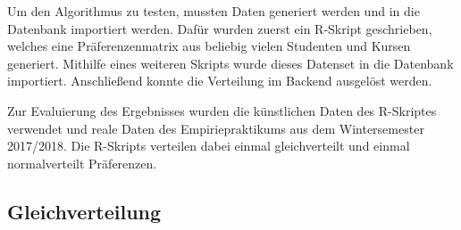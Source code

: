 		Um den Algorithmus zu testen, mussten Daten generiert werden und in die Datenbank importiert werden.
		Dafür wurden zuerst ein R-Skript geschrieben, welches eine Präferenzenmatrix aus beliebig vielen Studenten und Kursen generiert.
		Mithilfe eines weiteren Skripts wurde dieses Datenset in die Datenbank importiert.
		Anschließend konnte die Verteilung im Backend ausgelöst werden.\newline
		
		Zur Evaluierung des Ergebnisses wurden die künstlichen Daten des R-Skriptes verwendet und reale Daten des Empiriepraktikums aus dem Wintersemester 2017/2018.
		Die R-Skripts verteilen dabei einmal gleichverteilt und einmal normalverteilt Präferenzen.
		
		\subsection{Gleichverteilung}
	
